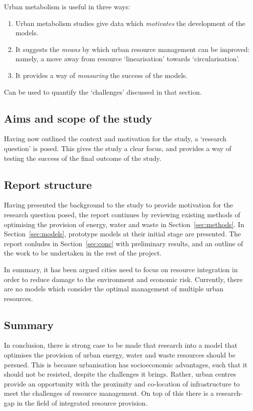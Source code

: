Urban metabolism is useful in three ways:
\begin{enumerate}
	\item Urban metabolism studies give data which \emph{motivates} the development of the models. 
	\item It suggests the \emph{means} by which urban resource management can be improved: namely, a move away from resource `linearisation' towards `circularisation'. 
	\item It provides a way of \emph{measuring} the success of the models. 
\end{enumerate}
Can be used to quantify the `challenges' discussed in that section.


\subsection{Aims and scope of the study} \label{sec:aims}
Having now outlined the context and motivation for the study, a `research question' is posed. This gives the study a clear focus, and provides a way of testing the success of the final outcome of the study.


\subsection{Report structure}
Having presented the background to the study to provide motivation for the research question posed, the report continues by reviewing existing methods of optimising the provision of energy, water and waste in Section~\ref{sec:methods}. In Section~\ref{sec:models}, prototype models at their initial stage are presented. The report conludes in Section~\ref{sec:conc} with preliminary results, and an outline of the work to be undertaken in the rest of the project.

In summary, it has been argued cities need to focus on resource integration in order to reduce damage to the environment and economic risk. Currently, there are no models which consider the optimal management of multiple urban resources.

\subsection{Summary}
In conclusion, there is strong case to be made that research into a model that optimises the provision of urban energy, water and waste resources should be persued. This is because urbanisation has socioeconomic advantages, such that it should not be resisted, despite the challenges it brings. Rather, urban centres provide an opportunity with the proximity and co-location of infrastructure to meet the challenges of resource management. On top of this there is a research-gap in the field of integrated resource provision.
